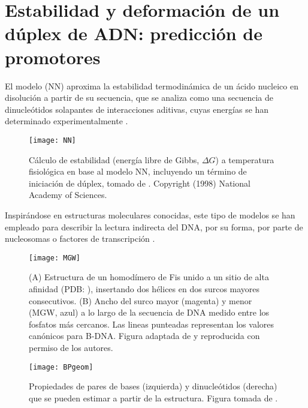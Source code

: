 \section{Estabilidad y deformaci\'{o}n de un d\'{u}plex de ADN: predicci\'{o}n de promotores} \label{dna1}
 
 
El modelo  (NN) aproxima la estabilidad termodin\'{a}mica de un \'{a}cido nucleico en disoluci\'{o}n
a partir de su secuencia, que se analiza como una secuencia de dinucle\'{o}tidos solapantes 
de interacciones aditivas, cuyas energ\'{i}as se han determinado experimentalmente \citep{Breslauer1986,SantaLucia1998}.

\begin{figure}
\begin{center} 
\texttt{[image: NN]}
\caption{C\'{a}lculo de estabilidad (energ\'{i}a libre de Gibbs, $\Delta G$) a temperatura fisiol\'{o}gica en base al modelo NN, 
incluyendo un t\'{e}rmino de iniciaci\'{o}n de d\'{u}plex, tomado de \citep{SantaLucia1998}.
Copyright (1998) National Academy of Sciences.
}
\label{fig:NN}
\end{center}
\end{figure}

Inspir\'{a}ndose en estructuras moleculares conocidas, 
este tipo de modelos se han empleado para describir la lectura indirecta del DNA, por su forma, 
por parte de nucleosomas \citep{Heijden2012} o factores de transcripci\'{o}n \citep{Gromiha2004,Espinosa2008}.

\begin{figure}
\begin{center} 
\texttt{[image: MGW]}
\caption{
(A) Estructura de un homod\'{i}mero de Fis unido a un sitio de alta afinidad 
(PDB: ), 
insertando dos h\'{e}lices en dos surcos mayores consecutivos. 
(B) Ancho del surco mayor (magenta) y menor (MGW, azul) a lo largo de la secuencia de DNA medido entre los fosfatos m\'{a}s cercanos.
Las lineas punteadas representan los valores can\'{o}nicos para B-DNA. 
Figura adaptada de \citet{Hancock2013} y reproducida con permiso de los autores.}
\label{fig:MGW}
\end{center}
\end{figure}

\begin{figure}
\begin{center} 
\texttt{[image: BPgeom]}
\caption{
Propiedades de pares de bases (izquierda) y dinucle\'{o}tidos (derecha) que se pueden estimar a partir de la estructura. 
Figura tomada de .}
\label{fig:BPgeometry}
\end{center}
\end{figure}

